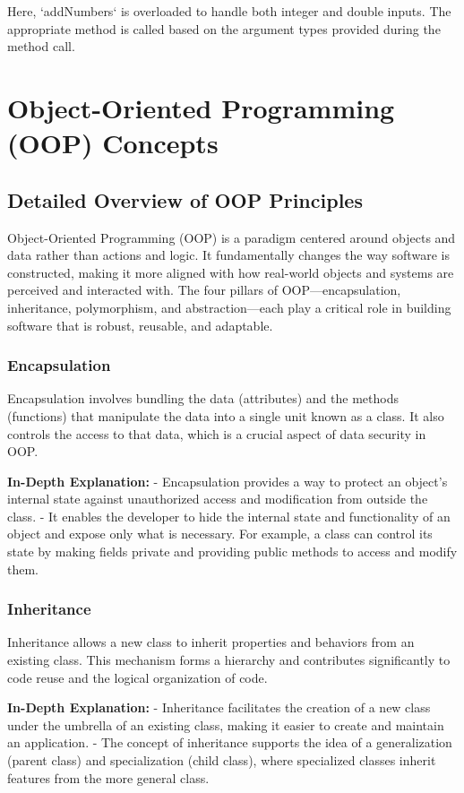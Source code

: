 \documentclass{article}
\begin{document}
Here, `addNumbers` is overloaded to handle both integer and double inputs. The appropriate method is called based on the argument types provided during the method call.

\section{Object-Oriented Programming (OOP) Concepts}
\subsection{Detailed Overview of OOP Principles}
Object-Oriented Programming (OOP) is a paradigm centered around objects and data rather than actions and logic. It fundamentally changes the way software is constructed, making it more aligned with how real-world objects and systems are perceived and interacted with. The four pillars of OOP—encapsulation, inheritance, polymorphism, and abstraction—each play a critical role in building software that is robust, reusable, and adaptable.

\subsubsection{Encapsulation}
Encapsulation involves bundling the data (attributes) and the methods (functions) that manipulate the data into a single unit known as a class. It also controls the access to that data, which is a crucial aspect of data security in OOP.

\textbf{In-Depth Explanation:}
- Encapsulation provides a way to protect an object's internal state against unauthorized access and modification from outside the class.
- It enables the developer to hide the internal state and functionality of an object and expose only what is necessary. For example, a class can control its state by making fields private and providing public methods to access and modify them.

\subsubsection{Inheritance}
Inheritance allows a new class to inherit properties and behaviors from an existing class. This mechanism forms a hierarchy and contributes significantly to code reuse and the logical organization of code.

\textbf{In-Depth Explanation:}
- Inheritance facilitates the creation of a new class under the umbrella of an existing class, making it easier to create and maintain an application.
- The concept of inheritance supports the idea of a generalization (parent class) and specialization (child class), where specialized classes inherit features from the more general class.
\end{document}

